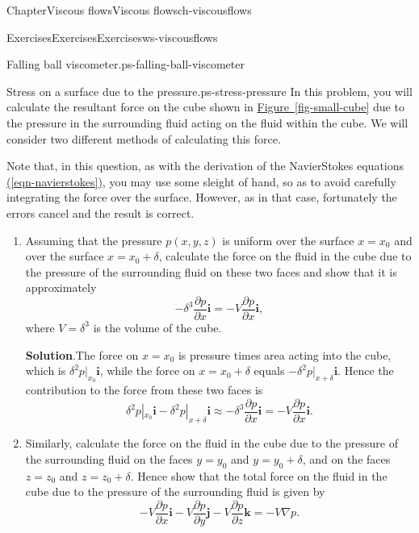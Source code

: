 \documentclass[oneside,10pt,]{book}
\newcommand{\blocktitlefont}{\relax}
\newcommand{\xreffont}{\relax}
\numberwithin{equation}{section}
\newcommand{\pd}[2]{\frac{\partial#1}{\partial#2}}
\newcommand{\bi}{\boldsymbol{i}}
\newcommand{\bj}{\boldsymbol{j}}
\newcommand{\bk}{\boldsymbol{k}}
\begin{document}
\begin{chapterptx}{Chapter}{Viscous flows}{}{Viscous flows}{}{}{ch-viscousflows}
\begin{exercises-section}{Exercises}{Exercises}{}{Exercises}{}{}{ws-viscousflows}
\begin{divisionexercise}{1}{Falling ball viscometer.}{}{ps-falling-ball-viscometer}
\begin{enumerate}[font=\bfseries,label=(\alph*),ref=\alph*]
\end{enumerate}%
\end{divisionexercise}%
\begin{divisionexercise}{2}{Stress on a surface due to the pressure.}{}{ps-stress-pressure}%
In this problem, you will calculate the resultant force on the cube shown in \hyperref[fig-small-cube]{Figure~{\xreffont\ref{fig-small-cube}}} due to the pressure in the surrounding fluid acting on the fluid within the cube. We will consider two different methods of calculating this force.%
 \par
Note that, in this question, as with the derivation of the Navier\textendash{}Stokes equations \hyperref[eqn-navierstokes]{({\xreffont\ref{eqn-navierstokes}})}, you may use some sleight of hand, so as to avoid carefully integrating the force over the surface. However, as in that case, fortunately the errors cancel and the result is correct.%
\begin{enumerate}[font=\bfseries,label=(\alph*),ref=\alph*]%
\item{}Assuming that the pressure \(p(x,y,z)\) is uniform over the surface \(x=x_0\) and over the surface \(x=x_0+\delta\), calculate the force on the fluid in the cube due to the pressure of the surrounding fluid on these two faces and show that it is approximately%
\begin{equation*}
-\delta^3\pd{p}{x}\bi=-V\pd{p}{x}\bi,
\end{equation*}
where \(V=\delta^3\) is the volume of the cube.%
\par\smallskip%
\noindent\textbf{\blocktitlefont Solution}.\hypertarget{ps-stress-pressure-3-2}{}\quad{}The force on \(x=x_0\) is pressure times area acting into the cube, which is \(\delta^2p|_{x_0}\bi\), while the force on \(x=x_0+\delta\) equals \(-\delta^2p|_{x+\delta}\bi\). Hence the contribution to the force from these two faces is%
\begin{equation*}
\delta^2p|_{x_0}\bi-\delta^2p|_{x+\delta}\bi
\approx-\delta^3\pd{p}{x}\bi=-V\pd{p}{x}\bi.
\end{equation*}
%
\item{}Similarly, calculate the force on the fluid in the cube due to the pressure of the surrounding fluid on the faces \(y=y_0\) and \(y=y_0+\delta\), and on the faces \(z=z_0\) and \(z=z_0+\delta\). Hence show that the total force on the fluid in the cube due to the pressure of the surrounding fluid is given by%
\begin{equation*}
-V\pd{p}{x}\bi-V\pd{p}{y}\bj-V\pd{p}{z}\bk=-V\nabla p.

\end{equation*}
\end{enumerate}
\end{divisionexercise}
\end{exercises-section}
\end{chapterptx}
\end{document}
